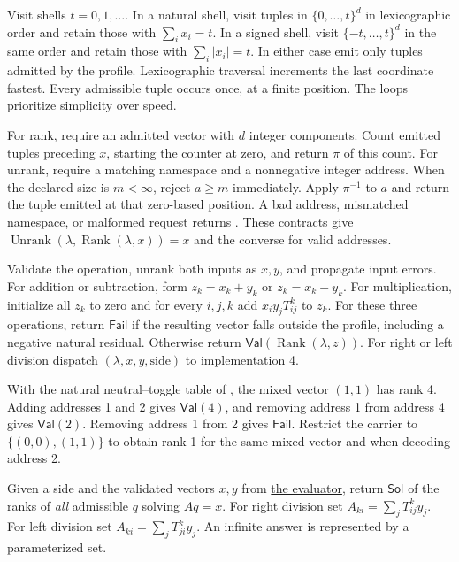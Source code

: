 Visit shells $t=0,1,\ldots$. In a natural shell, visit tuples in $\{0,\ldots,t\}^d$ in lexicographic order and retain those with $\sum_i x_i=t$. In a signed shell, visit $\{-t,\ldots,t\}^d$ in the same order and retain those with $\sum_i |x_i|=t$. In either case emit only tuples admitted by the profile. Lexicographic traversal increments the last coordinate fastest. Every admissible tuple occurs once, at a finite position. The loops prioritize simplicity over speed.

For rank, require an admitted vector with $d$ integer components. Count emitted tuples preceding $x$, starting the counter at zero, and return $\pi$ of this count. For unrank, require a matching namespace and a nonnegative integer address. When the declared size is $m<\infty$, reject $a\ge m$ immediately. Apply $\pi^{-1}$ to $a$ and return the tuple emitted at that zero-based position. A bad address, mismatched namespace, or malformed request returns . These contracts give $\operatorname{Unrank}(\lambda,\operatorname{Rank}(\lambda,x))=x$ and the converse for valid addresses.

Validate the operation, unrank both inputs as $x,y$, and propagate input errors. For addition or subtraction, form $z_k=x_k+y_k$ or $z_k=x_k-y_k$. For multiplication, initialize all $z_k$ to zero and for every $i,j,k$ add $x_i y_jT_{ij}^{k}$ to $z_k$. For these three operations, return $\mathsf{Fail}$ if the resulting vector falls outside the profile, including a negative natural residual. Otherwise return $\mathsf{Val}(\operatorname{Rank}(\lambda,z))$. For right or left division dispatch $(\lambda,x,y,\text{side})$ to \hyperlink{impl-4}{implementation 4}.

With the natural neutral--toggle table of , the mixed vector $(1,1)$ has rank 4. Adding addresses 1 and 2 gives $\mathsf{Val}(4)$, and removing address 1 from address 4 gives $\mathsf{Val}(2)$. Removing address 1 from 2 gives $\mathsf{Fail}$. Restrict the carrier to $\{(0,0),(1,1)\}$ to obtain rank 1 for the same mixed vector and  when decoding address 2.
\endgroup

\label{sos-impl-four}
\begingroup\small\raggedright
Given a side and the validated vectors $x,y$ from \hyperlink{impl-3}{the evaluator}, return $\mathsf{Sol}$ of the ranks of \emph{all} admissible $q$ solving $Aq=x$. For right division set $A_{ki}=\sum_j T_{ij}^k y_j$. For left division set $A_{ki}=\sum_j T_{ji}^k y_j$. An infinite answer is represented by a parameterized set.

